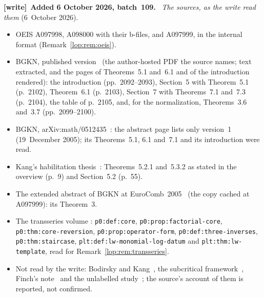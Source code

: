 \documentclass[11pt,letterpaper]{article}
\numberwithin{equation}{section}
\theoremstyle{remark}\newtheorem{remark}[theorem]{Remark}
\newcommand{\file}[1]{\nolinkurl{#1}}
\newenvironment{writenote}[1][]{\par\smallskip\begingroup\small
 \noindent\textbf{[write]}\if\relax\detokenize{#1}\relax\else~\textbf{#1.}\fi\ }%
 {\par\endgroup\smallskip}
\begin{document}
\begin{writenote}[Added 6 October 2026, batch~109]
\emph{The sources, as the write read them} (6~October 2026).
\begin{itemize}\raggedright
\item OEIS A097998, A098000 with their b-files, and A097999, in the
 internal format (Remark~\ref{lop:rem:oeis}).
\item BGKN, published version~\cite{bgkn} (the author-hosted PDF the source
 names; text extracted, and the pages of Theorems~5.1 and~6.1 and of the
 introduction rendered): the introduction (pp.~2092--2093),
 Section~5 with Theorem~5.1 (p.~2102), Theorem~6.1 (p.~2103), Section~7
 with Theorems~7.1 and~7.3 (p.~2104), the table of p.~2105, and, for the
 normalization, Theorems~3.6 and~3.7 (pp.~2099--2100).
\item BGKN, arXiv:math/0512435~\cite{bgknpreprint}: the abstract page lists
 only version~1 (19~December 2005); its Theorems~5.1, 6.1 and~7.1 and its
 introduction were read.
\item Kang's habilitation thesis~\cite{kang}: Theorems~5.2.1 and~5.3.2 as
 stated in the overview (p.~9) and Section~5.2 (p.~55).
\item The extended abstract of BGKN at EuroComb~2005~\cite{eurocomb} (the
 copy cached at A097999): its Theorem~3.
\item The transseries volume
 :
 \file{p0:def:core}, \file{p0:prop:factorial-core},
 \file{p0:thm:core-reversion}, \file{p0:prop:operator-form},
 \file{p0:def:three-inverses}, \file{p0:thm:staircase},
 \file{plt:def:lw-monomial-log-datum} and \file{plt:thm:lw-template}, read
 for Remark~\ref{lop:rem:transseries}.
\item Not read by the write: Bodirsky and Kang~\cite{bk}, the subcritical
 framework~\cite{subcritical}, Finch's note~\cite{finch} and the unlabelled
 study~\cite{unlabelled}; the source's account of them is reported, not
 confirmed.
\end{itemize}


\end{writenote}
\end{document}

